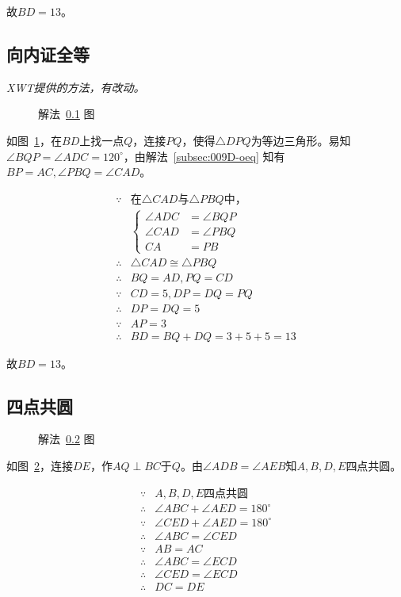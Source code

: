 故$BD = 13$。

\subsection{向内证全等} \label{subsec:009D-ieq}

\textit{XWT提供的方法，有改动。}

\begin{figure}[htbp]
  \centering
  \caption{解法~\ref{subsec:009D-ieq} 图} \label{fig:009D-ieq}
\end{figure}

如图~\ref{fig:009D-ieq}，在$BD$上找一点$Q$，连接$PQ$，使得$\triangle DPQ$为等边三角形。易知$\angle BQP = \angle ADC = 120^\circ$，由解法~\ref{subsec:009D-oeq} 知有$BP = AC, \angle PBQ = \angle CAD$。

\begin{align*}
  \because  {}& \text{在$\triangle CAD$与$\triangle PBQ$中，} \\
  & \left\{ \begin{aligned}
    \angle ADC &= \angle BQP \\
    \angle CAD &= \angle PBQ \\
    CA &= PB
  \end{aligned} \right. \\
  \therefore{}& \triangle CAD \cong \triangle PBQ \\
  \therefore{}& BQ = AD, PQ = CD \\
  \because  {}& CD = 5, DP = DQ = PQ \\
  \therefore{}& DP = DQ = 5 \\
  \because  {}& AP = 3 \\
  \therefore{}& BD = BQ + DQ = 3 + 5 + 5 = 13
\end{align*}

故$BD = 13$。

\subsection{四点共圆} \label{subsec:009D-circ}

\begin{figure}[htbp]
  \centering
  \caption{解法~\ref{subsec:009D-circ} 图} \label{fig:009D-circ}
\end{figure}

如图~\ref{fig:009D-circ}，连接$DE$，作$AQ \perp BC$于$Q$。由$\angle ADB = \angle AEB$知$A, B, D, E$四点共圆。

\begin{align*}
  \because  {}& \text{$A, B, D, E$四点共圆} \\
  \therefore{}& \angle ABC + \angle AED = 180^\circ \\
  \because  {}& \angle CED + \angle AED = 180^\circ \\
  \therefore{}& \angle ABC = \angle CED \\
  \because  {}& AB = AC \\
  \therefore{}& \angle ABC = \angle ECD \\
  \therefore{}& \angle CED = \angle ECD \\
  \therefore{}& DC = DE
\end{align*}

